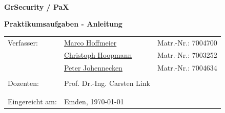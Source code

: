 \documentclass[
	fontsize=12pt, 
	paper=A4, 
	parskip=half, 
	DIV=calc, 
	headinclude=true, 
	footinclude=true, 
	open=right, 
	appendixprefix=true, 
	bibliography=totoc, 
	draft=false, 
	BCOR=0mm, 
	oneside ]{scrartcl}
\makeatletter
\newcommand{\firstauthor}{Marco Hoffmeier}
\newcommand{\firstid}{7004700}
\newcommand{\firstemail}{marco.hoffmeier@technik-emden.de}
\newcommand{\secondauthor}{Christoph Hoopmann}
\newcommand{\secondid}{7003252}
\newcommand{\secondemail}{christophhoopmann@gmail.com}
\newcommand{\thirdauthor}{Peter Johennecken}
\newcommand{\thirdid}{7004634}
\newcommand{\thirdemail}{peter.johennecken@technik-emden.de}
\newcommand{\mysupervisor}{Prof. Dr.-Ing. Carsten Link}
\newcommand{\myevaluator}{}
\newcommand{\mytitle}{GrSecurity / PaX}
\newcommand{\myworktitle}{Praktikumsaufgaben - Anleitung}
\newcommand{\mystudy}{Informatik}
\newcommand{\myuniversity}{Hochschule Emden - Leer}
\newcommand{\myinstitute}{Technik}
\newcommand{\myhometown}{Emden}
\newcommand{\mysubmissiondate}{\today}
\newcommand{\mysubmissiontown}{\myhometown}
\makeatother
\begin{document}
\begin{titlepage}

\large  %

%

\begin{center}
~
\vfill\vfill\vfill
\vfill\vfill\vfill
\vfill\vfill\vfill
\vfill\vfill\vfill

{\huge\bfseries\mytitle}

\vfill

{\Large\bfseries\myworktitle}


\vfill\vfill\vfill
\vfill\vfill\vfill

\end{center}

\begin{tabular}{lll} 
Verfasser: 		& \href{mailto:\firstemail}{\firstauthor}  & Matr.-Nr.: \firstid \\
				& \href{mailto:\secondemail}{\secondauthor}  & Matr.-Nr.: \secondid \\
				& \href{mailto:\thirdemail}{\thirdauthor}  & Matr.-Nr.: \thirdid \\
				\\
Dozenten:		& \mysupervisor\\
				& \myevaluator \\
				\\
Eingereicht am: & \mysubmissiontown , \mysubmissiondate
\end{tabular}

\end{titlepage}

\cleardoublepage
\tableofcontents
\pagebreak


\end{document}
